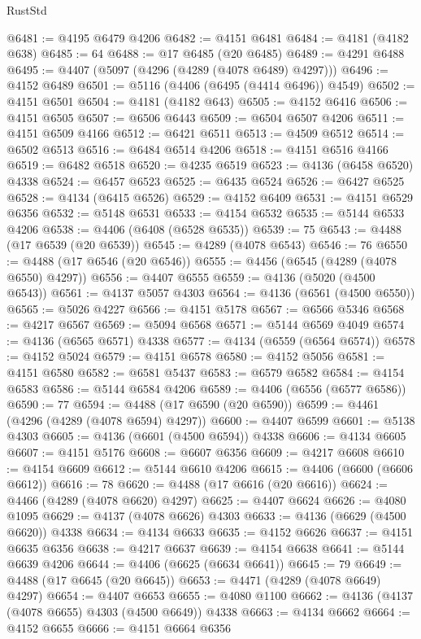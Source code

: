 \begin{lexlean}{RustStd}
\begin{coremodule}
{\begin{coremodule}
{{{{{{{{{{{{{{{{{{{{{{{{{{{{{{{{{{{{{{{{{{{{{{{{{{@6481 := @4195 @6479 @4206
@6482 := @4151 @6481
@6484 := @4181 (@4182 @638)
@6485 := 64
@6488 := @17 @6485 (@20 @6485)
@6489 := @4291 @6488
@6495 := @4407 (@5097 (@4296 (@4289 (@4078 @6489) @4297)))
@6496 := @4152 @6489
@6501 := @5116 (@4406 (@6495 (@4414 @6496)) @4549)
@6502 := @4151 @6501
@6504 := @4181 (@4182 @643)
@6505 := @4152 @6416
@6506 := @4151 @6505
@6507 := @6506 @6443
@6509 := @6504 @6507 @4206
@6511 := @4151 @6509 @4166
@6512 := @6421 @6511
@6513 := @4509 @6512
@6514 := @6502 @6513
@6516 := @6484 @6514 @4206
@6518 := @4151 @6516 @4166
@6519 := @6482 @6518
@6520 := @4235 @6519
@6523 := @4136 (@6458 @6520) @4338
@6524 := @6457 @6523
@6525 := @6435 @6524
@6526 := @6427 @6525
@6528 := @4134 (@6415 @6526)
@6529 := @4152 @6409
@6531 := @4151 @6529 @6356
@6532 := @5148 @6531
@6533 := @4154 @6532
@6535 := @5144 @6533 @4206
@6538 := @4406 (@6408 (@6528 @6535))
@6539 := 75
@6543 := @4488 (@17 @6539 (@20 @6539))
@6545 := @4289 (@4078 @6543)
@6546 := 76
@6550 := @4488 (@17 @6546 (@20 @6546))
@6555 := @4456 (@6545 (@4289 (@4078 @6550) @4297))
@6556 := @4407 @6555
@6559 := @4136 (@5020 (@4500 @6543))
@6561 := @4137 @5057 @4303
@6564 := @4136 (@6561 (@4500 @6550))
@6565 := @5026 @4227
@6566 := @4151 @5178
@6567 := @6566 @5346
@6568 := @4217 @6567
@6569 := @5094 @6568
@6571 := @5144 @6569 @4049
@6574 := @4136 (@6565 @6571) @4338
@6577 := @4134 (@6559 (@6564 @6574))
@6578 := @4152 @5024
@6579 := @4151 @6578
@6580 := @4152 @5056
@6581 := @4151 @6580
@6582 := @6581 @5437
@6583 := @6579 @6582
@6584 := @4154 @6583
@6586 := @5144 @6584 @4206
@6589 := @4406 (@6556 (@6577 @6586))
@6590 := 77
@6594 := @4488 (@17 @6590 (@20 @6590))
@6599 := @4461 (@4296 (@4289 (@4078 @6594) @4297))
@6600 := @4407 @6599
@6601 := @5138 @4303
@6605 := @4136 (@6601 (@4500 @6594)) @4338
@6606 := @4134 @6605
@6607 := @4151 @5176
@6608 := @6607 @6356
@6609 := @4217 @6608
@6610 := @4154 @6609
@6612 := @5144 @6610 @4206
@6615 := @4406 (@6600 (@6606 @6612))
@6616 := 78
@6620 := @4488 (@17 @6616 (@20 @6616))
@6624 := @4466 (@4289 (@4078 @6620) @4297)
@6625 := @4407 @6624
@6626 := @4080 @1095
@6629 := @4137 (@4078 @6626) @4303
@6633 := @4136 (@6629 (@4500 @6620)) @4338
@6634 := @4134 @6633
@6635 := @4152 @6626
@6637 := @4151 @6635 @6356
@6638 := @4217 @6637
@6639 := @4154 @6638
@6641 := @5144 @6639 @4206
@6644 := @4406 (@6625 (@6634 @6641))
@6645 := 79
@6649 := @4488 (@17 @6645 (@20 @6645))
@6653 := @4471 (@4289 (@4078 @6649) @4297)
@6654 := @4407 @6653
@6655 := @4080 @1100
@6662 := @4136 (@4137 (@4078 @6655) @4303 (@4500 @6649)) @4338
@6663 := @4134 @6662
@6664 := @4152 @6655
@6666 := @4151 @6664 @6356
}}}}}}}}}}}}}}}}}}}}}}}}}}}}}}}}}}}}}}}}}}}}}}}}}}
\end{coremodule}}
\end{coremodule}
\end{lexlean}
